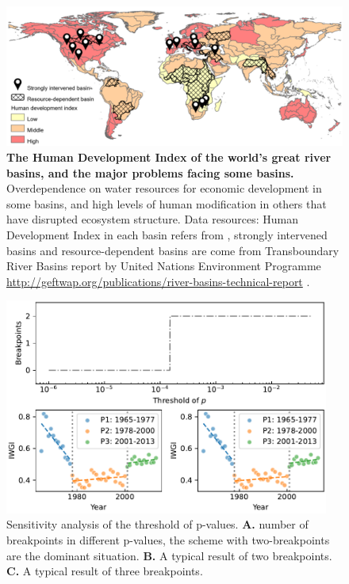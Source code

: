 \documentclass[9pt,twoside,lineno]{pnas-new}
\begin{document}
\begin{figure}%
	\centering
	\includegraphics[width=\linewidth]{../../figures/main/map.pdf}
	\caption{
		\textbf{The Human Development Index of the world's great river basins, and the major problems facing some basins.}
		Overdependence on water resources for economic development in some basins, and high levels of human modification in others that have disrupted ecosystem structure. Data resources: Human Development Index in each basin refers from \cite{linkeGlobalHydroenvironmentalSubbasin2019}, strongly intervened basins and resource-dependent basins are come from Transboundary River Basins report by United Nations Environment Programme \url{http://geftwap.org/publications/river-basins-technical-report} \cite{unep-dhiTransboundaryRiverBasins2016}.
	}
	\label{fig:traps}
\end{figure}




\begin{figure}
    \centering
    \includegraphics[width=0.95\textwidth]{../../figures/sup/sensitivity.pdf}
    \caption{
        Sensitivity analysis of the threshold of p-values.
        \textbf{A.} number of breakpoints in different p-values, the scheme with two-breakpoints are the dominant situation.
        \textbf{B.} A typical result of two breakpoints.
        \textbf{C.} A typical result of three breakpoints.
    }
\end{figure}
\end{document}
